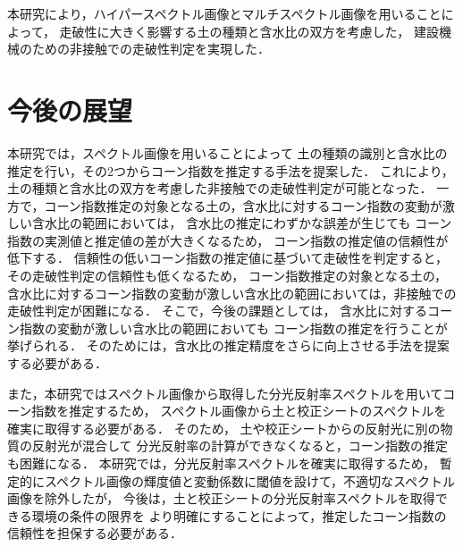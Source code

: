 本研究により，ハイパースペクトル画像とマルチスペクトル画像を用いることによって，
走破性に大きく影響する土の種類と含水比の双方を考慮した，
建設機械のための非接触での走破性判定を実現した．

\newpage


\section{今後の展望}

本研究では，スペクトル画像を用いることによって
土の種類の識別と含水比の推定を行い，その2つからコーン指数を推定する手法を提案した．
これにより，土の種類と含水比の双方を考慮した非接触での走破性判定が可能となった．
一方で，コーン指数推定の対象となる土の，含水比に対するコーン指数の変動が激しい含水比の範囲においては，
含水比の推定にわずかな誤差が生じても
コーン指数の実測値と推定値の差が大きくなるため，
コーン指数の推定値の信頼性が低下する．
信頼性の低いコーン指数の推定値に基づいて走破性を判定すると，その走破性判定の信頼性も低くなるため，
コーン指数推定の対象となる土の，含水比に対するコーン指数の変動が激しい含水比の範囲においては，非接触での走破性判定が困難になる．
そこで，今後の課題としては，
含水比に対するコーン指数の変動が激しい含水比の範囲においても
コーン指数の推定を行うことが挙げられる．
そのためには，含水比の推定精度をさらに向上させる手法を提案する必要がある．

また，本研究ではスペクトル画像から取得した分光反射率スペクトルを用いてコーン指数を推定するため，
スペクトル画像から土と校正シートのスペクトルを確実に取得する必要がある．
そのため，
土や校正シートからの反射光に別の物質の反射光が混合して
分光反射率の計算ができなくなると，コーン指数の推定も困難になる．
本研究では，分光反射率スペクトルを確実に取得するため，
暫定的にスペクトル画像の輝度値と変動係数に閾値を設けて，不適切なスペクトル画像を除外したが，
今後は，土と校正シートの分光反射率スペクトルを取得できる環境の条件の限界を
より明確にすることによって，推定したコーン指数の信頼性を担保する必要がある．


